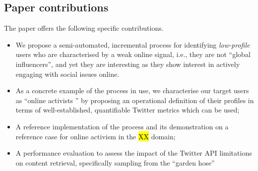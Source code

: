 \documentclass[runningheads]{llncs}
\begin{document}




\subsection{Paper contributions}

The paper offers the following specific contributions.
\begin{itemize}
\item We propose a semi-automated, incremental process for identifying \textit{low-profile} users who are characterised by a weak online signal, i.e., they are not ``global influencers'', and yet they are interesting as they show interest in actively engaging with social issues online. 

\item As a concrete example of the process in use, we characterise our target users as ``online activists '' by proposing an operational definition of their profiles in terms of well-established, quantifiable Twitter metrics which can be used;

\item A reference implementation of the process and its demonstration on a reference case for online activism in the \hl{XX} domain;

\item A performance evaluation to assess the impact of the Twitter API limitations on content retrieval, specifically sampling from the ``garden hose'' 
\end{itemize}
\end{document}
